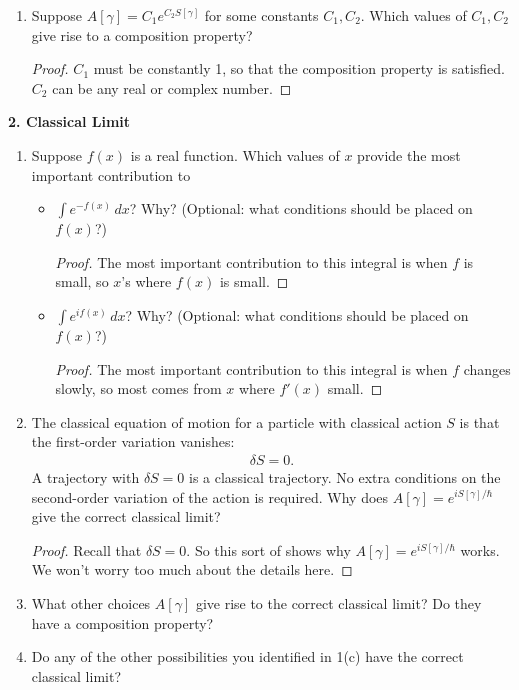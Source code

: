 \documentclass{book}
\theoremstyle{definition}
\begin{document}
\begin{enumerate}
	
	
	\item Suppose $A[\gamma] = C_1 e^{C_2 S[\gamma]}$ for some constants $C_1,C_2$. Which values of $C_1,C_2$ give rise to a composition property? 
	
	\begin{proof}
		$C_1$ must be constantly 1, so that the composition property is satisfied. $C_2$ can be any real or complex number. 
	\end{proof}
	

\end{enumerate}




\noindent \textbf{2. Classical Limit}
\begin{enumerate}
	\item Suppose $f(x)$ is a real function. Which values of $x$ provide the most important contribution to 
	\begin{itemize}
		\item $\int e^{-f(x)}\,dx$? Why? (Optional: what conditions should be placed on $f(x)$?)
		
		
		\begin{proof}
			The most important contribution to this integral is when $f$ is small, so $x$'s where $f(x)$ is small. 
		\end{proof}
	
	
		\item $\int e^{if(x)}\,dx$? Why? (Optional: what conditions should be placed on $f(x)$?)
		
		
		\begin{proof}
			The most important contribution to this integral is when $f$ changes slowly, so most comes from $x$ where $f'(x)$ small. 
		\end{proof}
	\end{itemize}



	\item The classical equation of motion for a particle with classical action $S$ is that the first-order variation vanishes:
	\begin{align}
	\delta S = 0.
	\end{align}
	A trajectory with $\delta S = 0$ is a classical trajectory. No extra conditions on the second-order variation of the action is required. Why does $A[\gamma] = e^{iS[\gamma]/\hbar}$ give the correct classical limit? 
	
	\begin{proof}
		Recall that $\delta S = 0$. So this sort of shows why $A[\gamma] = e^{iS[\gamma]/\hbar}$ works. We won't worry too much about the details here.
		
	\end{proof}
	
	\item What other choices $A[\gamma]$ give rise to the correct classical limit? Do they have a composition property? 
	
	\item Do any of the other possibilities you identified in 1(c) have the correct classical limit? 
\end{enumerate}
\end{document}
